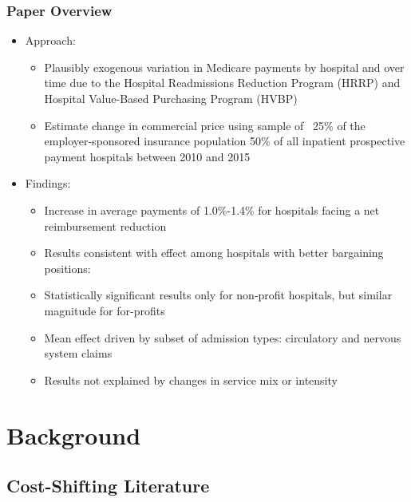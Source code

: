 \documentclass{beamer}
\begin{document}
\begin{frame}
\frametitle{Paper Overview}
\begin{itemize}
\item Approach:
\begin{itemize}
\item Plausibly exogenous variation in Medicare payments by hospital and over time due to the Hospital Readmissions Reduction Program (HRRP) and Hospital Value-Based Purchasing Program (HVBP)
\item Estimate change in commercial price using sample of ~25$\%$ of the employer-sponsored insurance population 50$\%$ of all inpatient prospective payment hospitals between 2010 and 2015
\end{itemize}
\item Findings:
\begin{itemize}
\item Increase in average payments of 1.0$\%$-1.4$\%$ for hospitals facing a net reimbursement reduction
\item Results consistent with effect among hospitals with better bargaining positions: %
\item Statistically significant results only for non-profit hospitals, but similar magnitude for for-profits
\item Mean effect driven by subset of admission types: circulatory and nervous system claims
\item Results not explained by changes in service mix or intensity
\end{itemize}
\end{itemize}
\end{frame}

\section{Background} 

\subsection{Cost-Shifting Literature} %
\end{document}
